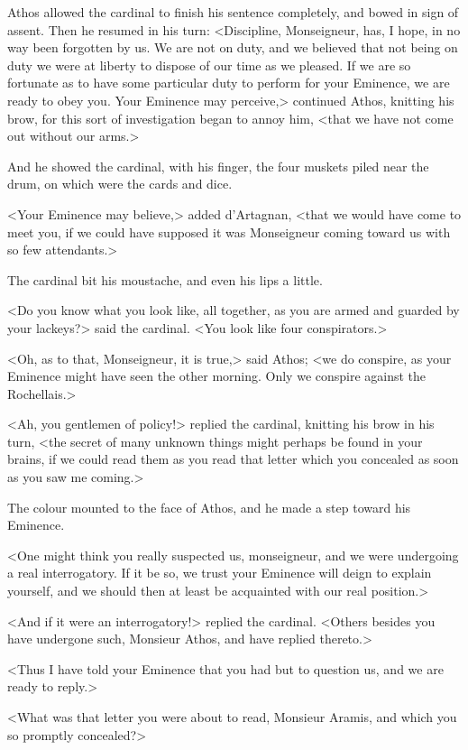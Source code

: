 Athos allowed the cardinal to finish his sentence completely, and bowed in sign of assent. Then he resumed in his turn: <Discipline, Monseigneur, has, I hope, in no way been forgotten by us. We are not on duty, and we believed that not being on duty we were at liberty to dispose of our time as we pleased. If we are so fortunate as to have some particular duty to perform for your Eminence, we are ready to obey you. Your Eminence may perceive,> continued Athos, knitting his brow, for this sort of investigation began to annoy him, <that we have not come out without our arms.> 

And he showed the cardinal, with his finger, the four muskets piled near the drum, on which were the cards and dice. 

<Your Eminence may believe,> added d'Artagnan, <that we would have come to meet you, if we could have supposed it was Monseigneur coming toward us with so few attendants.> 

The cardinal bit his moustache, and even his lips a little. 

<Do you know what you look like, all together, as you are armed and guarded by your lackeys?> said the cardinal. <You look like four conspirators.> 

<Oh, as to that, Monseigneur, it is true,> said Athos; <we do conspire, as your Eminence might have seen the other morning. Only we conspire against the Rochellais.> 

<Ah, you gentlemen of policy!> replied the cardinal, knitting his brow in his turn, <the secret of many unknown things might perhaps be found in your brains, if we could read them as you read that letter which you concealed as soon as you saw me coming.> 

The colour mounted to the face of Athos, and he made a step toward his Eminence. 

<One might think you really suspected us, monseigneur, and we were undergoing a real interrogatory. If it be so, we trust your Eminence will deign to explain yourself, and we should then at least be acquainted with our real position.> 

<And if it were an interrogatory!> replied the cardinal. <Others besides you have undergone such, Monsieur Athos, and have replied thereto.> 

<Thus I have told your Eminence that you had but to question us, and we are ready to reply.> 

<What was that letter you were about to read, Monsieur Aramis, and which you so promptly concealed?> 

